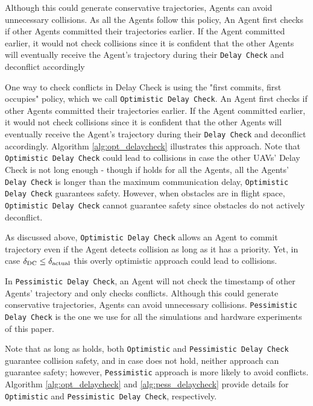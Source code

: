 Although this could generate conservative trajectories, Agents can avoid unnecessary collisions.
As all the Agents follow this policy,  An Agent first checks if other Agents committed their trajectories earlier. If the Agent committed earlier, it would not check collisions since it is confident that the other Agents will eventually receive the Agent's trajectory during their {\tt Delay Check} and deconflict accordingly

One way to check conflicts in Delay Check is using the "first commits, first occupies" policy, which we call {\tt Optimistic Delay Check}. 
An Agent first checks if other Agents committed their trajectories earlier. If the Agent committed earlier, it would not check collisions since it is confident that the other Agents will eventually receive the Agent's trajectory during their {\tt Delay Check} and deconflict accordingly. 
Algorithm \ref{alg:opt_delaycheck} illustrates this approach. Note that {\tt Optimistic Delay Check} could lead to collisions in case the other UAVs' Delay Check is not long enough - though if \NeccessaryCond{} holds for all the Agents, all the Agents' {\tt Delay Check} is longer than the maximum communication delay, {\tt Optimistic Delay Check} guarantees safety. 
However, when obstacles are in flight space, {\tt Optimistic Delay Check} cannot guarantee safety since obstacles do not actively deconflict. 

As discussed above, {\tt Optimistic Delay Check} allows an Agent to commit trajectory even if the Agent detects collision as long as it has a priority. Yet, in case $\delta_\text{DC}\le\delta_\text{actual}$ this overly optimistic approach could lead to collisions.

In {\tt Pessimistic Delay Check}, an Agent will not check the timestamp of other Agents' trajectory and only checks conflicts. Although this could generate conservative trajectories, Agents can avoid unnecessary collisions. {\tt Pessimistic Delay Check} is the one we use for all the simulations and hardware experiments of this paper.

Note that as long as \NeccessaryCond{} holds, both {\tt Optimistic} and {\tt Pessimistic Delay Check} guarantee collision safety, and in case \NeccessaryCond{} does not hold, neither approach can guarantee safety; however, {\tt Pessimistic} approach is more likely to avoid conflicts. Algorithm \ref{alg:opt_delaycheck} and \ref{alg:pess_delaycheck} provide details for {\tt Optimistic} and {\tt Pessimistic Delay Check}, respectively.

